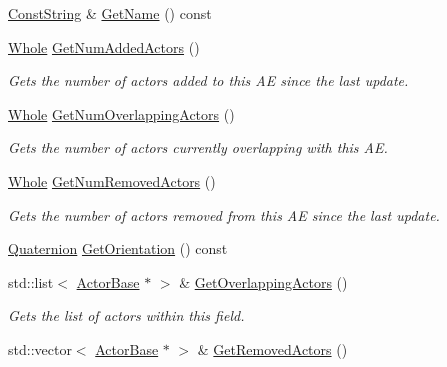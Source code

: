 \begin{DoxyCompactItemize}
\item 
\hyperlink{namespaceMezzanine_a63cd699ac54b73953f35ec9cfc05e506}{ConstString} \& \hyperlink{classMezzanine_1_1AreaEffect_ae0205e57786da97300357d7ac1afd180}{GetName} () const 
\item 
\hyperlink{namespaceMezzanine_adcbb6ce6d1eb4379d109e51171e2e493}{Whole} \hyperlink{classMezzanine_1_1AreaEffect_a40bbe87e9212eccae31bef25eaf142b1}{GetNumAddedActors} ()
\begin{DoxyCompactList}\small\item\em Gets the number of actors added to this AE since the last update. \item\end{DoxyCompactList}\item 
\hyperlink{namespaceMezzanine_adcbb6ce6d1eb4379d109e51171e2e493}{Whole} \hyperlink{classMezzanine_1_1AreaEffect_af257df2bf68c1c34bc4ced3daa182ee5}{GetNumOverlappingActors} ()
\begin{DoxyCompactList}\small\item\em Gets the number of actors currently overlapping with this AE. \item\end{DoxyCompactList}\item 
\hyperlink{namespaceMezzanine_adcbb6ce6d1eb4379d109e51171e2e493}{Whole} \hyperlink{classMezzanine_1_1AreaEffect_ac5755475929edb8c24474ec976772072}{GetNumRemovedActors} ()
\begin{DoxyCompactList}\small\item\em Gets the number of actors removed from this AE since the last update. \item\end{DoxyCompactList}\item 
\hyperlink{classMezzanine_1_1Quaternion}{Quaternion} \hyperlink{classMezzanine_1_1AreaEffect_a18c9fa2cbac6e1b62d9c34b56e8f7dc9}{GetOrientation} () const 
\item 
std::list$<$ \hyperlink{classMezzanine_1_1ActorBase}{ActorBase} $\ast$ $>$ \& \hyperlink{classMezzanine_1_1AreaEffect_a69f19ed2d67dca2623df6e6331b31462}{GetOverlappingActors} ()
\begin{DoxyCompactList}\small\item\em Gets the list of actors within this field. \item\end{DoxyCompactList}\item 
std::vector$<$ \hyperlink{classMezzanine_1_1ActorBase}{ActorBase} $\ast$ $>$ \& \hyperlink{classMezzanine_1_1AreaEffect_ac657b565ca47198c6fd900c8a588948b}{GetRemovedActors} ()

\end{DoxyCompactItemize}
